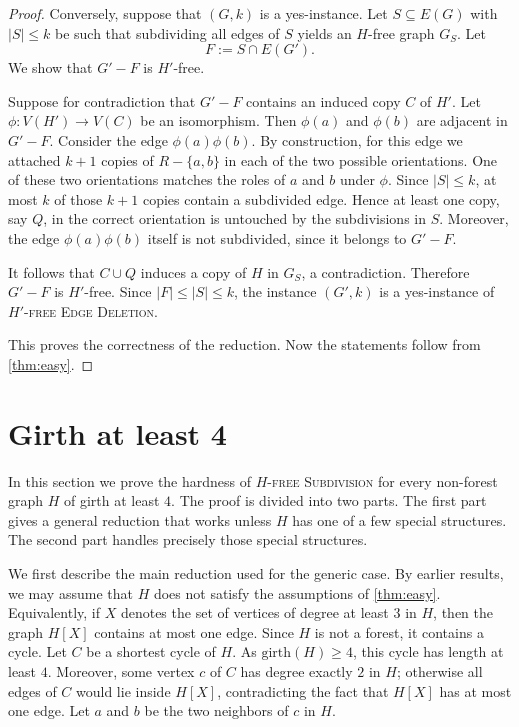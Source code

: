 \documentclass[a4paper,UKenglish,cleveref, autoref, thm-restate]{lipics-v2021}
\newcommand{\girth}{\mathrm{girth}}
\begin{document}
\begin{proof}
    Conversely, suppose that $(G,k)$ is a yes-instance.
    Let $S\subseteq E(G)$ with $|S|\le k$ be such that subdividing all edges of $S$ yields an $H$-free graph $G_S$.
    Let
    \[
        F := S\cap E(G').
    \]
    We show that $G'-F$ is $H'$-free.

    Suppose for contradiction that $G'-F$ contains an induced copy $C$ of $H'$.
    Let $\phi:V(H')\to V(C)$ be an isomorphism.
    Then $\phi(a)$ and $\phi(b)$ are adjacent in $G'-F$.
    Consider the edge $\phi(a)\phi(b)$.
    By construction, for this edge we attached $k+1$ copies of $R-\{a,b\}$ in each of the two possible orientations.
    One of these two orientations matches the roles of $a$ and $b$ under $\phi$.
    Since $|S|\le k$, at most $k$ of those $k+1$ copies contain a subdivided edge.
    Hence at least one copy, say $Q$, in the correct orientation is untouched by the subdivisions in $S$.
    Moreover, the edge $\phi(a)\phi(b)$ itself is not subdivided, since it belongs to $G'-F$.

    It follows that $C\cup Q$ induces a copy of $H$ in $G_S$, a contradiction.
    Therefore $G'-F$ is $H'$-free.
    Since $|F|\le |S|\le k$, the instance $(G',k)$ is a yes-instance of \textsc{$H'$-free Edge Deletion}.

    This proves the correctness of the reduction. Now the statements follow from \cref{thm:easy}.
\end{proof}

\section{Girth at least 4}
\label{sec:girth4}

In this section we prove the hardness of \textsc{$H$-free Subdivision} for every non-forest graph $H$ of girth at least $4$.
The proof is divided into two parts.
The first part gives a general reduction that works unless $H$ has one of a few special structures.
The second part handles precisely those special structures.

\GirthFourTheorem*

We first describe the main reduction used for the generic case.
By earlier results, we may assume that $H$ does not satisfy the assumptions of \cref{thm:easy}.
Equivalently, if $X$ denotes the set of vertices of degree at least $3$ in $H$, then the graph $H[X]$ contains at most one edge.
Since $H$ is not a forest, it contains a cycle.
Let $C$ be a shortest cycle of $H$.
As $\girth(H)\geq 4$, this cycle has length at least $4$.
Moreover, some vertex $c$ of $C$ has degree exactly $2$ in $H$; otherwise all edges of $C$ would lie inside $H[X]$, contradicting the fact that $H[X]$ has at most one edge.
Let $a$ and $b$ be the two neighbors of $c$ in $H$.
\end{document}
